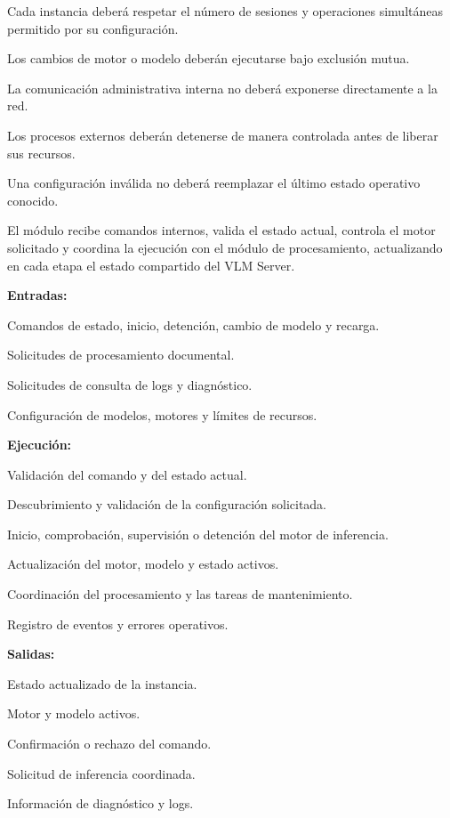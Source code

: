 \begin{definicionmodulo}
\item[Restricciones]
\begin{elementosmodulo}
    \item Cada instancia deberá respetar el número de sesiones y operaciones simultáneas permitido por su configuración.
    \item Los cambios de motor o modelo deberán ejecutarse bajo exclusión mutua.
    \item La comunicación administrativa interna no deberá exponerse directamente a la red.
    \item Los procesos externos deberán detenerse de manera controlada antes de liberar sus recursos.
    \item Una configuración inválida no deberá reemplazar el último estado operativo conocido.
\end{elementosmodulo}

\item[Estructura general] El módulo recibe comandos internos, valida el estado actual, controla el motor solicitado y coordina la ejecución con el módulo de procesamiento, actualizando en cada etapa el estado compartido del VLM Server.

\textbf{Entradas:}
\begin{elementosmodulo}
    \item Comandos de estado, inicio, detención, cambio de modelo y recarga.
    \item Solicitudes de procesamiento documental.
    \item Solicitudes de consulta de logs y diagnóstico.
    \item Configuración de modelos, motores y límites de recursos.
\end{elementosmodulo}

\textbf{Ejecución:}
\begin{elementosmodulo}
    \item Validación del comando y del estado actual.
    \item Descubrimiento y validación de la configuración solicitada.
    \item Inicio, comprobación, supervisión o detención del motor de inferencia.
    \item Actualización del motor, modelo y estado activos.
    \item Coordinación del procesamiento y las tareas de mantenimiento.
    \item Registro de eventos y errores operativos.
\end{elementosmodulo}

\textbf{Salidas:}
\begin{elementosmodulo}
    \item Estado actualizado de la instancia.
    \item Motor y modelo activos.
    \item Confirmación o rechazo del comando.
    \item Solicitud de inferencia coordinada.
    \item Información de diagnóstico y logs.
\end{elementosmodulo}

\end{definicionmodulo}


